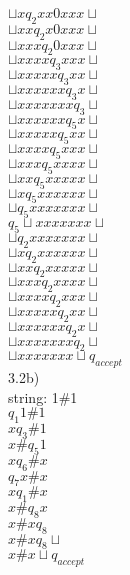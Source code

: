 \documentclass[11pt]{article}
\begin{document}
$\sqcup x q_2 x x 0 x x x \sqcup$\\
$\sqcup x x q_2 x 0 x x x \sqcup$\\
$\sqcup x x x q_2 0 x x x \sqcup$\\
$\sqcup x x x x q_3 x x x \sqcup$\\
$\sqcup x x x x x q_3 x x \sqcup$\\
$\sqcup x x x x x x q_3 x \sqcup$\\
$\sqcup x x x x x x x q_3 \sqcup$\\
$\sqcup x x x x x x q_5 x \sqcup$\\
$\sqcup x x x x x q_5 x x \sqcup$\\
$\sqcup x x x x q_5 x x x \sqcup$\\
$\sqcup x x x q_5 x x x x \sqcup$\\
$\sqcup x x q_5 x x x x x \sqcup$\\
$\sqcup x q_5 x x x x x x \sqcup$\\
$\sqcup q_5 x x x x x x x \sqcup$\\
$q_5 \sqcup x x x x x x x \sqcup$\\
$\sqcup q_2 x x x x x x x \sqcup$\\
$\sqcup x q_2 x x x x x x \sqcup$\\
$\sqcup x x q_2 x x x x x \sqcup$\\
$\sqcup x x x q_2 x x x x \sqcup$\\
$\sqcup x x x x q_2 x x x \sqcup$\\
$\sqcup x x x x x q_2 x x \sqcup$\\
$\sqcup x x x x x x q_2 x \sqcup$\\
$\sqcup x x x x x x x q_2 \sqcup$\\
$\sqcup x x x x x x x \sqcup q_{accept}$\\


\noindent3.2b)\\
string: 1\#1\\
$q_1 1\#1$\\
$x q_3 \# 1$\\
$x \# q_5 1$\\
$x q_6 \# x$\\
$q_7 x \# x$\\
$x q_1 \# x$\\
$x \# q_8 x$\\
$x \# x q_8$\\
$x \# x q_8 \sqcup$\\
$x \# x \sqcup q_{accept}$\\ \\
\end{document}
